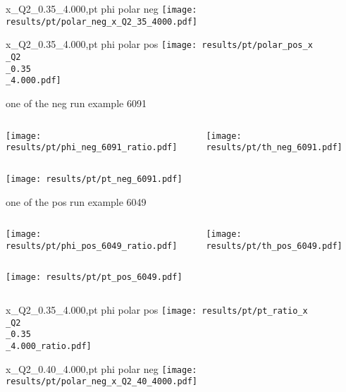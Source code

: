 \begin{frame}{x\_Q2\_0.35\_4.000,pt phi polar neg}
\texttt{[image: results/pt/polar\_neg\_x\_Q2\_35\_4000.pdf]}
\end{frame}
\begin{frame}{x\_Q2\_0.35\_4.000,pt phi polar pos}
\texttt{[image: results/pt/polar\_pos\_x\\\_Q2\\\_0.35\\\_4.000.pdf]}
\end{frame}
\begin{frame}{one of the neg run example 6091}
\begin{columns}
\begin{column}[T]{0.5\textwidth}
\texttt{[image: results/pt/phi\_neg\_6091\_ratio.pdf]}
\end{column}
\begin{column}[T]{0.5\textwidth}
\texttt{[image: results/pt/th\_neg\_6091.pdf]}
\end{column}
\end{columns}
\texttt{[image: results/pt/pt\_neg\_6091.pdf]}
\end{frame}
\begin{frame}{one of the pos run example 6049}
\begin{columns}
\begin{column}[T]{0.5\textwidth}
\texttt{[image: results/pt/phi\_pos\_6049\_ratio.pdf]}
\end{column}
\begin{column}[T]{0.5\textwidth}
\texttt{[image: results/pt/th\_pos\_6049.pdf]}
\end{column}
\end{columns}
\begin{columns}
\begin{column}[T]{0.5\textwidth}
\texttt{[image: results/pt/pt\_pos\_6049.pdf]}
\end{column}
\begin{column}[T]{0.5\textwidth}
\end{column}
\end{columns}
\end{frame}
\begin{frame}{x\_Q2\_0.35\_4.000,pt phi polar pos}
\texttt{[image: results/pt/pt\_ratio\_x\\\_Q2\\\_0.35\\\_4.000\_ratio.pdf]}
\end{frame}
\begin{frame}{x\_Q2\_0.40\_4.000,pt phi polar neg}
\texttt{[image: results/pt/polar\_neg\_x\_Q2\_40\_4000.pdf]}
\end{frame}

